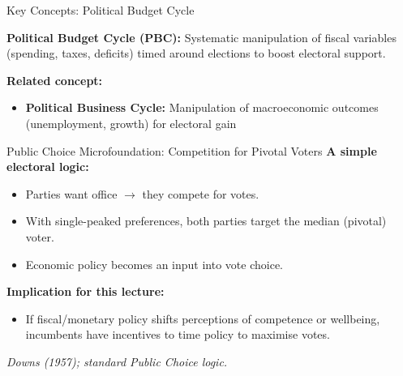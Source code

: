 \documentclass[10pt]{beamer}
\begin{document}
\begin{frame}{Key Concepts: Political Budget Cycle}
\begin{tcolorbox}[colback=myTeal!5, colframe=myTeal, title=Definition]
\textbf{Political Budget Cycle (PBC):} Systematic manipulation of fiscal variables (spending, taxes, deficits) timed around elections to boost electoral support.
\end{tcolorbox}

\vspace{0.3cm}
\textbf{Related concept:}
\begin{itemize}
\item \textbf{Political Business Cycle:} Manipulation of macroeconomic outcomes (unemployment, growth) for electoral gain
\end{itemize}
\end{frame}

\begin{frame}{Public Choice Microfoundation: Competition for Pivotal Voters}
\textbf{A simple electoral logic:}

\begin{itemize}
\item Parties want office $\rightarrow$ they compete for votes.
\item With single-peaked preferences, both parties target the \alert{median (pivotal) voter}.
\item Economic policy becomes an input into vote choice.
\end{itemize}

\vspace{0.4cm}
\textbf{Implication for this lecture:}
\begin{itemize}
\item If fiscal/monetary policy shifts perceptions of competence or wellbeing,
incumbents have incentives to \alert{time} policy to maximise votes.
\end{itemize}

\vspace{0.2cm}
\textit{Downs (1957); standard Public Choice logic.}
\end{frame}
\end{document}
